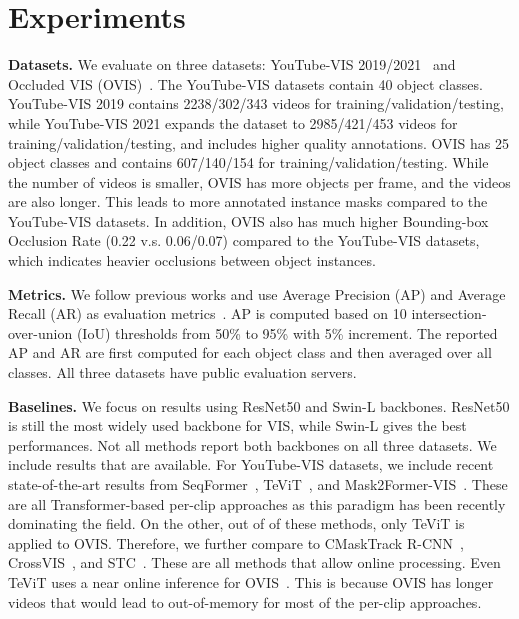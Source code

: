 \section{Experiments}
\label{sec:exp}

\noindent\textbf{Datasets.} We evaluate \ours on three datasets: YouTube-VIS 2019/2021~\cite{yang2019video} and Occluded VIS (OVIS)~\cite{qi2021occluded}. The YouTube-VIS datasets contain 40 object classes. YouTube-VIS 2019 contains 2238/302/343 videos for training/validation/testing, while YouTube-VIS 2021 expands the dataset to 2985/421/453 videos for training/validation/testing, and includes higher quality annotations. OVIS has 25 object classes and contains 607/140/154 for training/validation/testing. While the number of videos is smaller, OVIS has more objects per frame, and the videos are also longer. This leads to more annotated instance masks compared to the YouTube-VIS datasets. In addition, OVIS also has much higher Bounding-box Occlusion Rate (0.22 v.s. 0.06/0.07) compared to the YouTube-VIS datasets, which indicates heavier occlusions between object instances.

\noindent\textbf{Metrics.} We follow previous works and use Average Precision (AP) and Average Recall (AR) as evaluation metrics~\cite{yang2019video}. AP is computed based on 10 intersection-over-union (IoU) thresholds from 50\% to 95\% with 5\% increment. The reported AP and AR are first computed for each object class and then averaged over all classes. All three datasets have public evaluation servers.

\noindent\textbf{Baselines.} We focus on results using ResNet50 and Swin-L backbones. ResNet50 is still the most widely used backbone for VIS, while Swin-L gives the best performances. Not all methods report both backbones on all three datasets. We include results that are available. For YouTube-VIS datasets, we include recent state-of-the-art results from SeqFormer~\cite{wu2021seqformer}, TeViT~\cite{yang2022tevit}, and Mask2Former-VIS~\cite{cheng2021mask2former}. These are all Transformer-based per-clip approaches as this paradigm has been recently dominating the field. On the other, out of of these methods, only TeViT is applied to OVIS. Therefore, we further compare to CMaskTrack R-CNN~\cite{qi2021occluded}, CrossVIS~\cite{yang2021crossover}, and STC~\cite{jiang2022stc}. These are all methods that allow online processing. Even TeViT uses a near online inference for OVIS~\cite{athar2020stem}. This is because OVIS has longer videos that would lead to out-of-memory for most of the per-clip approaches. 

